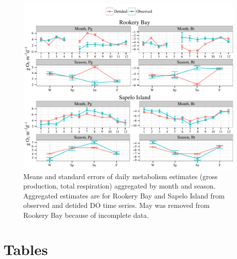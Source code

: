 \documentclass[letterpaper,12pt,oneside]{article}\usepackage[]{graphicx}\usepackage[]{color}
\makeatletter
\def\maxwidth{ %
  \ifdim\Gin@nat@width>\linewidth
    \linewidth
  \else
    \Gin@nat@width
  \fi
}
\newenvironment{knitrout}{}{} %
\makeatother
\begin{document}
\centering\vspace*{\fill}
\begin{knitrout}
\color{fgcolor}\begin{figure}[!ht]


{\centering \includegraphics[width=\maxwidth]{figure/metab_sum2} 

}

\caption[Means and standard errors of daily metabolism estimates (gross production, total respiration) aggregated by month and season]{Means and standard errors of daily metabolism estimates (gross production, total respiration) aggregated by month and season.  Aggregated estimates are for Rookery Bay and Sapelo Island from observed and detided \ac{DO} time series.  May was removed from Rookery Bay because of incomplete data.\label{fig:metab_sum2}}
\end{figure}


\end{knitrout}
\vfill
\clearpage


\section{Tables}
\end{document}
